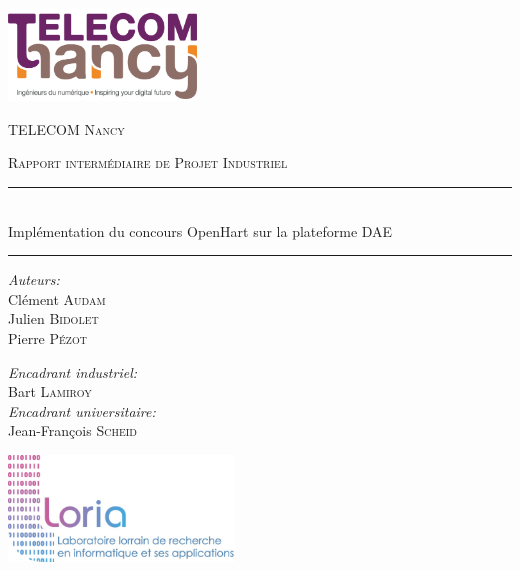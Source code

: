 \newcommand{\HRule}{\rule{\linewidth}{0.5mm}}

\begin{titlepage}
\begin{center}

\includegraphics[width=5cm]{telecom_nancy}
\vfill

\textsc{\LARGE TELECOM Nancy}
\vfill

\textsc{\Large Rapport intermédiaire de Projet Industriel}
\vfill

\HRule \\[0.4cm]
\Huge{Implémentation du concours OpenHart sur la plateforme DAE}
\HRule
\vfill

\begin{minipage}[t]{0.4\textwidth}
    \begin{flushleft} \large
        \emph{Auteurs:}\\
        Clément \textsc{Audam}\\
        Julien \textsc{Bidolet}\\
        Pierre \textsc{Pézot}
    \end{flushleft}
\end{minipage}
\begin{minipage}[t]{0.4\textwidth}
    \begin{flushright} \large
        \emph{Encadrant industriel:}\\
        Bart \textsc{Lamiroy}\\
        \emph{Encadrant universitaire:}\\
        Jean-François \textsc{Scheid}
    \end{flushright}
\end{minipage}
\vfill

\includegraphics[width=6cm]{loria}
\end{center}
\end{titlepage}
